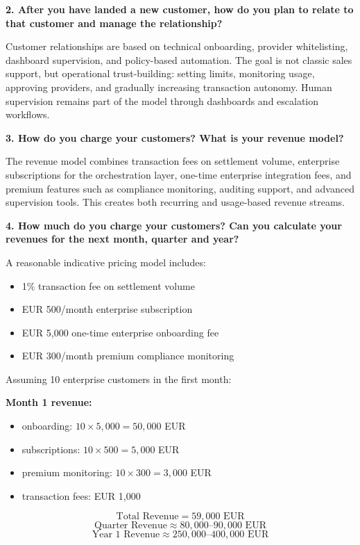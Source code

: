 \documentclass[12pt,a4paper,oneside]{article}
\theoremstyle{definition}
\theoremstyle{plain}
\begin{document}
\vspace{0.5em}

\textbf{2. After you have landed a new customer, how do you plan to relate to that customer and manage the relationship?}

Customer relationships are based on technical onboarding, provider whitelisting, dashboard supervision, and policy-based automation. The goal is not classic sales support, but operational trust-building: setting limits, monitoring usage, approving providers, and gradually increasing transaction autonomy. Human supervision remains part of the model through dashboards and escalation workflows.

\vspace{0.5em}

\textbf{3. How do you charge your customers? What is your revenue model?}

The revenue model combines transaction fees on settlement volume, enterprise subscriptions for the orchestration layer, one-time enterprise integration fees, and premium features such as compliance monitoring, auditing support, and advanced supervision tools. This creates both recurring and usage-based revenue streams.

\vspace{0.5em}

\textbf{4. How much do you charge your customers? Can you calculate your revenues for the next month, quarter and year?}

A reasonable indicative pricing model includes:

\begin{itemize}
    \item 1\% transaction fee on settlement volume
    \item EUR 500/month enterprise subscription
    \item EUR 5,000 one-time enterprise onboarding fee
    \item EUR 300/month premium compliance monitoring
\end{itemize}

Assuming 10 enterprise customers in the first month:

\textbf{Month 1 revenue:}

\begin{itemize}
    \item onboarding: $10 \times 5{,}000 = 50{,}000$ EUR
    \item subscriptions: $10 \times 500 = 5{,}000$ EUR
    \item premium monitoring: $10 \times 300 = 3{,}000$ EUR
    \item transaction fees: EUR 1,000
\end{itemize}
\[
\text{Total Revenue} = 59{,}000 \text{ EUR}
\]
\[
\text{Quarter Revenue} \approx 80{,}000\text{--}90{,}000 \text{ EUR}
\]
\[
\text{Year 1 Revenue} \approx 250{,}000\text{--}400{,}000 \text{ EUR}
\]
\end{document}
